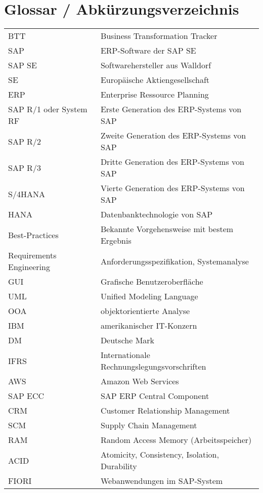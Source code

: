\newpage

\tableofcontents

\newpage

\section*{Glossar / Abkürzungsverzeichnis}
\begin{xltabular}{\textwidth}{p{0.4\textwidth}p{0.6\textwidth}}
    BTT & Business Transformation Tracker\\
    SAP & ERP-Software der SAP SE\\
    SAP SE & Softwarehersteller aus Walldorf\\
    SE & Europäische Aktiengesellschaft\\
    ERP & Enterprise Ressource Planning\\
    SAP R/1 oder System RF & Erste Generation des ERP-Systems von SAP\\
    SAP R/2 & Zweite Generation des ERP-Systems von SAP\\
    SAP R/3 & Dritte Generation des ERP-Systems von SAP\\
    S/4HANA & Vierte Generation des ERP-Systems von SAP\\
    HANA & Datenbanktechnologie von SAP\\
    Best-Practices & Bekannte Vorgehensweise mit bestem Ergebnis\\
    Requirements Engineering & Anforderungsspezifikation, Systemanalyse\\
    GUI & Grafische Benutzeroberfläche\\
    UML & Unified Modeling Language\\
    OOA & objektorientierte Analyse\\
    IBM & amerikanischer IT-Konzern\\
    DM & Deutsche Mark\\
    IFRS & Internationale Rechnungslegungsvorschriften\\
    AWS & Amazon Web Services\\
    SAP ECC & SAP ERP Central Component\\
    CRM & Customer Relationship Management\\
    SCM & Supply Chain Management\\
    RAM & Random Access Memory (Arbeitsspeicher)\\
    ACID & Atomicity, Consistency, Isolation, Durability \\
    FIORI & Webanwendungen im SAP-System\\

\end{xltabular}
